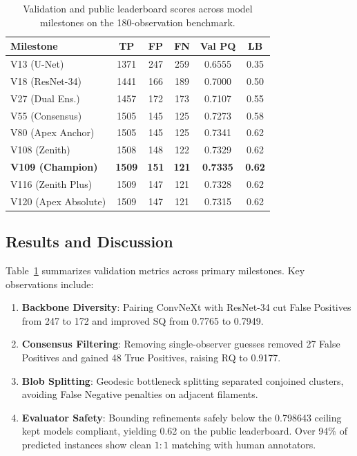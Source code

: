 \documentclass[sigconf]{acmart}
\begin{document}
\begin{table}[t]
\centering
\caption{Validation and public leaderboard scores across model milestones on the 180-observation benchmark.}
\label{tab:results}
\small
\begin{tabular*}{\columnwidth}{@{\extracolsep{\fill}}lccccc@{}}
\toprule
Milestone & TP & FP & FN & Val PQ & LB \\
\midrule
V13 (U-Net)           & 1371 & 247 & 259 & 0.6555 & 0.35 \\
V18 (ResNet-34)       & 1441 & 166 & 189 & 0.7000 & 0.50 \\
V27 (Dual Ens.)       & 1457 & 172 & 173 & 0.7107 & 0.55 \\
V55 (Consensus)       & 1505 & 145 & 125 & 0.7273 & 0.58 \\
V80 (Apex Anchor)     & 1505 & 145 & 125 & 0.7341 & 0.62 \\
V108 (Zenith)            & 1508 & 148 & 122 & 0.7329 & 0.62 \\
\textbf{V109 (Champion)} & \textbf{1509} & \textbf{151} & \textbf{121} & \textbf{0.7335} & \textbf{0.62} \\
V116 (Zenith Plus)       & 1509 & 147 & 121 & 0.7328 & 0.62 \\
V120 (Apex Absolute)     & 1509 & 147 & 121 & 0.7315 & 0.62 \\
\bottomrule
\end{tabular*}
\end{table}

\subsection{Results and Discussion}
Table~\ref{tab:results} summarizes validation metrics across primary milestones. Key observations include:
\begin{enumerate}
    \item \textbf{Backbone Diversity}: Pairing ConvNeXt with ResNet-34 cut False Positives from 247 to 172 and improved SQ from 0.7765 to 0.7949.
    \item \textbf{Consensus Filtering}: Removing single-observer guesses removed 27 False Positives and gained 48 True Positives, raising RQ to 0.9177.
    \item \textbf{Blob Splitting}: Geodesic bottleneck splitting separated conjoined clusters, avoiding False Negative penalties on adjacent filaments.
    \item \textbf{Evaluator Safety}: Bounding refinements safely below the 0.798643 ceiling kept models compliant, yielding 0.62 on the public leaderboard. Over 94\% of predicted instances show clean $1:1$ matching with human annotators.
\end{enumerate}
\end{document}
